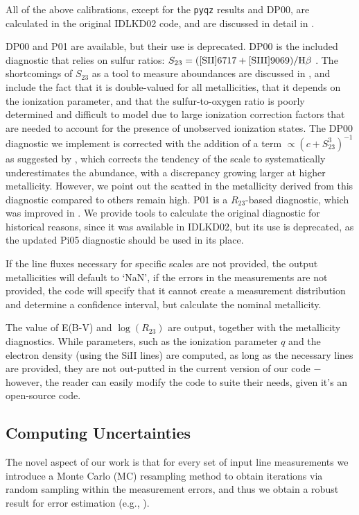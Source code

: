 \documentclass{emulateapj}
\begin{document}
All of the above calibrations, except for the \verb=pyqz= results and DP00, are calculated in the original IDLKD02 code, and are discussed in detail in \citet{kewley02,kewley08}. 

DP00 and P01 are available, but their use is deprecated. DP00 is the included diagnostic that relies on sulfur ratios: $ S_{23}= {\rm ( [SII]6717+[SIII]9069) } / {\rm H}\beta $ . The shortcomings of $S_{23}$ as a tool to measure aboundances are discussed in \citet{kewley02}, and include the fact that it is double-valued for all metallicities, that it depends on the ionization parameter, and that the sulfur-to-oxygen ratio is poorly determined and difficult to model due to large ionization correction factors that are needed to account for the presence of unobserved ionization states. The DP00 diagnostic we implement is corrected with the addition of a term $\propto (c+S_{23}^3)^{-1}$ as suggested by \citep{kewley02}, which corrects the tendency of the scale to systematically underestimates the abundance, with a discrepancy growing larger at higher metallicity. However, we point out the scatted in the metallicity derived from this diagnostic compared to others remain high. P01 \citep{pilyugin01} is a $R_{23}$-based diagnostic, which was improved in \citet{pilyugin05}. We provide tools to calculate the original diagnostic for historical reasons, since it was available in IDLKD02, but its use is deprecated, as the updated Pi05 diagnostic should be used in its place.

If the line fluxes necessary for specific scales are not provided, the output  metallicities will default to `NaN', if the errors in the measurements are not provided, the code will specify that it cannot create a measurement distribution and determine a confidence interval, but calculate the nominal metallicity.

The value of E(B-V) and $\log(R_{23})$ are output, together with the metallicity diagnostics. While parameters, such as the ionization parameter $q$ and the electron density (using the SiII lines) are computed, as long as the necessary lines are provided, they are not out-putted in the current version of our code $-$ however, the reader can easily modify the code to suite their needs, given it's an open-source code.



\subsection{Computing Uncertainties}
The novel aspect of our work is that for every set of input line measurements we introduce a Monte Carlo (MC) resampling method to obtain iterations via random sampling within the measurement errors, and thus we obtain a robust result for error estimation (e.g., \citealt{efron79,hastie09,andrae10}). 
\end{document}
